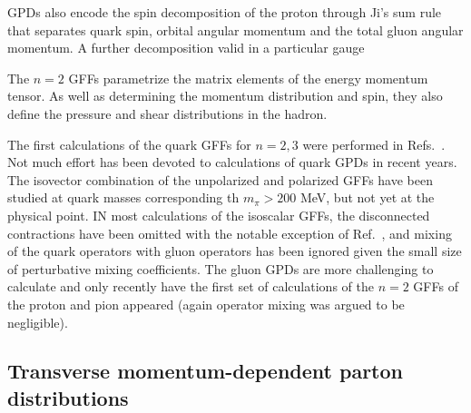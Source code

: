 GPDs also encode the spin decomposition of the proton through Ji's sum rule \cite{} that separates quark spin, orbital angular momentum and the total gluon angular momentum. A further decomposition valid in a particular gauge

The $n=2$ GFFs  parametrize the matrix elements of the energy momentum tensor. As well as determining the momentum distribution and spin, they 
also define the pressure and shear distributions in the hadron.

The first calculations of the quark GFFs for $n=2,3$ were performed in Refs.~\cite{}. Not much effort has been devoted to calculations of quark GPDs in recent years. The isovector combination of the unpolarized and polarized GFFs have been studied at quark masses corresponding th $m_\pi>200$ MeV, but not yet at the physical point. IN most calculations of the isoscalar GFFs, the disconnected contractions have been omitted with the notable exception of Ref.~\cite{Deka:2013zha}, and mixing of the quark operators with gluon operators has been ignored given the small size of perturbative mixing coefficients. 
The gluon GPDs are more challenging to calculate and only recently have the first set of calculations of the $n=2$ GFFs of the proton and pion appeared (again operator mixing was argued to be negligible).


\subsection{Transverse momentum-dependent parton distributions}



